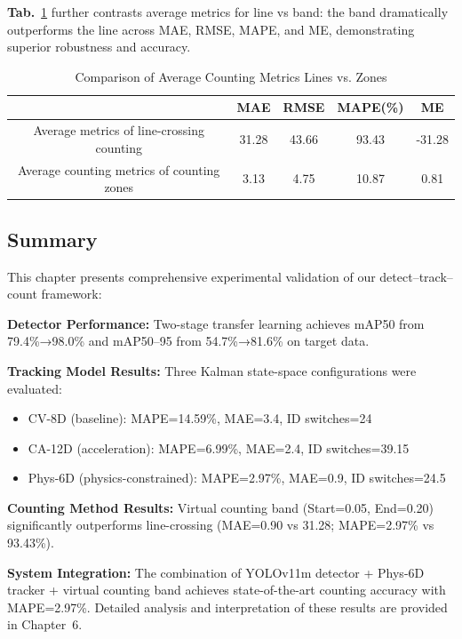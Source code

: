 \textbf{Tab.}~\ref{tab:ComparisonofAverage} further contrasts average metrics for line vs band: the band dramatically outperforms the line across MAE, RMSE, MAPE, and ME, demonstrating superior robustness and accuracy.
\begin{table}[H]
    \centering
    \begin{tabular}{ccccc}
    \midrule
        \textbf{} & \textbf{MAE} & \textbf{RMSE} & \textbf{MAPE(\%)} & \textbf{ME } \\ \midrule
        Average metrics of line-crossing counting & 31.28  & 43.66  & 93.43  & -31.28   \\
        Average counting metrics of counting zones & 3.13  & 4.75  & 10.87  & 0.81  \\ \midrule
    \end{tabular}
    \caption{Comparison of Average Counting Metrics Lines vs. Zones}
    \label{tab:ComparisonofAverage}
\end{table}

\subsection{Summary}
This chapter presents comprehensive experimental validation of our detect–track–count framework:

\textbf{Detector Performance:} Two-stage transfer learning achieves mAP50 from 79.4\%→98.0\% and mAP50–95 from 54.7\%→81.6\% on target data.

\textbf{Tracking Model Results:} Three Kalman state-space configurations were evaluated:
\begin{itemize}
    \item CV-8D (baseline): MAPE=14.59\%, MAE=3.4, ID switches=24
    \item CA-12D (acceleration): MAPE=6.99\%, MAE=2.4, ID switches=39.15  
    \item Phys-6D (physics-constrained): MAPE=2.97\%, MAE=0.9, ID switches=24.5
\end{itemize}

\textbf{Counting Method Results:} Virtual counting band (Start=0.05, End=0.20) significantly outperforms line-crossing (MAE=0.90 vs 31.28; MAPE=2.97\% vs 93.43\%).

\textbf{System Integration:} The combination of YOLOv11m detector + Phys-6D tracker + virtual counting band achieves state-of-the-art counting accuracy with MAPE=2.97\%. Detailed analysis and interpretation of these results are provided in Chapter~6.

